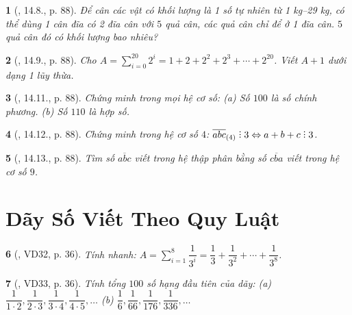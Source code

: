 \documentclass{article}
\newtheorem{baitoan}{}
\DeclareRobustCommand{\divby}{%
	\mathrel{\vbox{\baselineskip.65ex\lineskiplimit0pt\hbox{.}\hbox{.}\hbox{.}}}%
}
\begin{document}
\begin{baitoan}[\cite{TLCT_THCS_Toan_6_so_hoc}, 14.8., p. 88]
	Để cân các vật có khối lượng là 1 số tự nhiên từ {\rm1 kg--29 kg}, có thể dùng 1 cân đĩa có 2 đĩa cân với $5$ quả cân, các quả cân chỉ để ở 1 đĩa cân. $5$ quả cân đó có khối lượng bao nhiêu?
\end{baitoan}

\begin{baitoan}[\cite{TLCT_THCS_Toan_6_so_hoc}, 14.9., p. 88]
	Cho $A = \sum_{i=0}^{20} 2^i = 1 + 2 + 2^2 + 2^3 + \cdots + 2^{20}$. Viết $A + 1$ dưới dạng 1 lũy thừa.
\end{baitoan}

\begin{baitoan}[\cite{TLCT_THCS_Toan_6_so_hoc}, 14.11., p. 88]
	Chứng minh trong mọi hệ cơ số: (a) Số $100$ là số chính phương. (b) Số $110$ là hợp số.
\end{baitoan}

\begin{baitoan}[\cite{TLCT_THCS_Toan_6_so_hoc}, 14.12., p. 88]
	Chứng minh trong hệ cơ số $4$: $\overline{abc}_{(4)}\divby3\Leftrightarrow a + b + c\divby3$.
\end{baitoan}

\begin{baitoan}[\cite{TLCT_THCS_Toan_6_so_hoc}, 14.13., p. 88]
	Tìm số $\overline{abc}$ viết trong hệ thập phân bằng số $\overline{cba}$ viết trong hệ cơ số $9$.
\end{baitoan}


\section{Dãy Số Viết Theo Quy Luật}

\begin{baitoan}[\cite{Binh_Toan_6_tap_2}, VD32, p. 36]
	Tính nhanh: $A = \sum_{i=1}^8 \dfrac{1}{3^i} = \dfrac{1}{3} + \dfrac{1}{3^2} + \cdots + \dfrac{1}{3^8}$.
\end{baitoan}

\begin{baitoan}[\cite{Binh_Toan_6_tap_2}, VD33, p. 36]
	Tính tổng $100$ số hạng đầu tiên của dãy: (a) $\dfrac{1}{1\cdot2},\dfrac{1}{2\cdot3},\dfrac{1}{3\cdot4},\dfrac{1}{4\cdot5},\ldots$ (b) $\dfrac{1}{6},\dfrac{1}{66},\dfrac{1}{176},\dfrac{1}{336},\ldots$
\end{baitoan}
\end{document}
